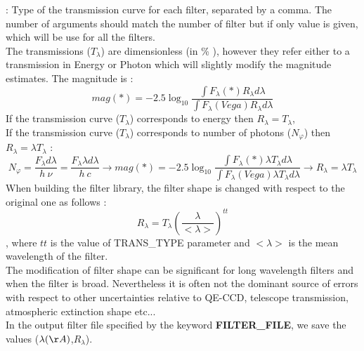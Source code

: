 \documentclass[12pt]{article}
\begin{document}
 : 
 Type of the transmission curve for each filter, separated by a comma. 
 The number of arguments should match the number of filter but if only value is given,
  which will be use for all the filters. \\ 
 The transmissions ($T_{\lambda}$)   are dimensionless (in \% ), however they refer 
 either to a  transmission in Energy or Photon which will slightly modify the
 magnitude estimates. 
  The magnitude is :
  \[ mag(*) = -2.5 \log_{10} \frac{\int F_{\lambda}(*) R_{\lambda} d\lambda}{\int F_{\lambda}(Vega) R_{\lambda} d\lambda}  \] 
 If the transmission curve ($T_{\lambda}$)  corresponds to energy then $R_{\lambda}=T_{\lambda}$, \\
%
 If the transmission curve ($T_{\lambda}$) corresponds to number of photons ($N_{\varphi}$) then $R_{\lambda}= \lambda T_{\lambda}$ : 
% 
\[ N_{\varphi} =  \frac{ F_{\lambda} d\lambda }{h\ \nu} = \frac{F_{\lambda} \lambda d\lambda }{h\ c} \rightarrow  
 mag(*)=-2.5 \log_{10} \frac{\int F_{\lambda}(*) \lambda T_{\lambda} d\lambda}{\int F_{\lambda}(Vega) \lambda T_{\lambda} d\lambda}  \rightarrow  R_{\lambda}=\lambda T_{\lambda}  \]
%
 When building the filter library, the filter shape is changed with respect to the original one as
 follows :
 \[ R_{\lambda}=T_{\lambda} ( \frac{\lambda}{< \lambda >})^{tt} \],
  where $tt$ is the value of  TRANS\_TYPE parameter and  $< \lambda >$ is the mean
  wavelength of the filter. \\
%
The modification of filter shape can be significant for long wavelength filters and when the filter is broad.  Nevertheless it is often not the dominant source of errors with respect to other uncertainties relative to QE-CCD, telescope transmission, atmospheric extinction shape etc... \\
 In the output filter file specified by the keyword {\bf FILTER\_FILE}, we save the values  
 ($\lambda (\AA)$,$R_{\lambda}$). \\
%
 
\end{document}
